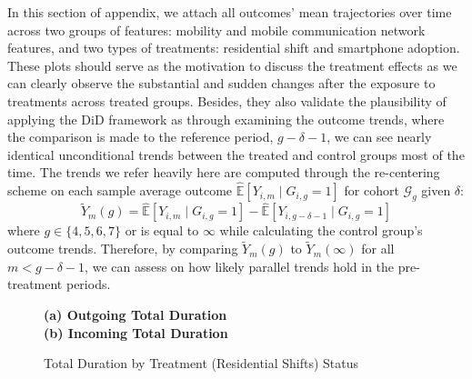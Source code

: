 
\label{appendix_event_centered_trends}

In this section of appendix, we attach all outcomes' mean trajectories over time across two groups of features: mobility and mobile communication network features, and two types of treatments: residential shift and smartphone adoption. These plots should serve as the motivation to discuss the treatment effects as we can clearly observe the substantial and sudden changes after the exposure to treatments across treated groups. Besides, they also validate the plausibility of applying the DiD framework as through examining the outcome trends, where the comparison is made to the reference period, $g-\delta-1$,
we can see nearly identical unconditional trends between the treated and control groups most of the time. The trends we refer heavily here are computed through the re-centering scheme on each sample average outcome $\hat{\mathbb{E}}[Y_{i, m} \mid G_{i, g} = 1]$ for cohort $\mathcal{G}_g$ given $\delta$:
$$
\tilde{Y}_{m}(g)
=
\hat{\mathbb{E}}[Y_{i, m} \mid G_{i, g} = 1]
-
\hat{\mathbb{E}}[Y_{i, g-\delta-1} \mid G_{i, g} = 1]
$$
where $g \in \{4, 5, 6, 7\}$ or is equal to $\infty$ while calculating the control group's outcome trends. Therefore, by comparing $\tilde{Y}_{m}(g)$ to $\tilde{Y}_{m}(\infty)$ for all $m < g-\delta-1$, we can assess on how likely parallel trends hold in the pre-treatment periods.

\begin{figure}[ht!]
\centering
\caption{Total Duration by Treatment (Residential Shifts) Status}
\vspace{0.3cm}

\textbf{(a) Outgoing Total Duration}\\


\vspace{0.3cm}
\textbf{(b) Incoming Total Duration}\\


\label{fig:effect_of_residential_shift_on_total_duration}
\end{figure}


